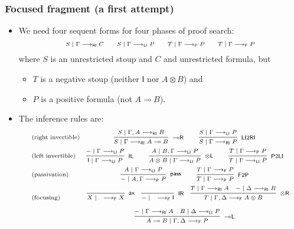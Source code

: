 \documentclass[10pt,t]{beamer}
\newcommand{\I}{\mathsf{I}}
\newcommand{\ot}{\otimes}
\newcommand{\ax}{\mathsf{ax}}
\newcommand{\uf}{\mathsf{pass}}
\newcommand{\IL}{\I\mathsf{L}}
\newcommand{\otL}{\ot\mathsf{L}}
\newcommand{\IR}{\I\mathsf{R}}
\newcommand{\otR}{\ot\mathsf{R}}
\newcommand{\loL}{{\lo}\mathsf{L}}
\newcommand{\loR}{{\lo}\mathsf{R}}
\renewcommand{\vdash}{\longrightarrow}
\newcommand{\lo}{\multimap}
\newcommand{\lolli}{\lo}
\newcommand{\proofbox}[1]{\begin{tabular}{l} #1 \end{tabular}}
\newcommand{\LI}{\mathsf{LI}}
\newcommand{\F}{\mathsf{F}}
\newcommand{\Pass}{\mathsf{P}}
\newcommand{\RI}{\mathsf{RI}}
\begin{document}
\begin{frame}


\frametitle{Focused fragment (a first attempt)}

\begin{itemize}

\item We need four sequent forms for four phases of proof search:
\[
\scriptsize
\begin{array}{c}
S \mid \Gamma \vdash_\RI C
\qquad S \mid \Gamma \vdash_\LI P
\qquad T \mid \Gamma \vdash_\Pass P
\qquad T \mid \Gamma \vdash_\F P
\end{array}
\]
where $S$ is an unrestricted stoup and $C$ and unrestricted formula,
but 
\begin{itemize}
\item $T$ is a negative stoup (neither $\I$ nor $A \ot B$) and
\item $P$ is a positive formula (not $A \lo B$).
\end{itemize}

\item The inference rules are:
\[
\scriptsize
  \begin{array}{l@{}c}
    \text{(right invertible)} & %
    \proofbox{
    \infer[\loR]{S \mid \Gamma \vdash_{\RI} A \lolli B}{S \mid \Gamma , A \vdash_{\RI} B}
    \qquad
    \infer[\LI 2 \RI]{S \mid \Gamma \vdash_{\RI} P}{S \mid \Gamma \vdash_{\LI} P}
    }
    \\[9pt]
    \text{(left invertible)} & %
    \proofbox{
    \infer[\IL]{\I \mid \Gamma \vdash_{\LI} P}{{-} \mid \Gamma \vdash_{\LI} P}
    \qquad
    \infer[\otL]{A \ot B \mid \Gamma \vdash_{\LI} P}{A \mid B , \Gamma \vdash_{\LI} P}
    \qquad
    \infer[\Pass 2 \LI]{T \mid \Gamma \vdash_{\LI} P}{T \mid \Gamma \vdash_{\Pass} P}
    }
    \\[9pt]
    \text{(passivation)} & %
    \proofbox{
      \infer[\uf]{{-} \mid A , \Gamma \vdash_{\Pass} P }{
      A\mid \Gamma \vdash_{\LI} P
    }
    \qquad
    \infer[\F 2 \Pass]{T \mid \Gamma \vdash_{\Pass} P}{
      T \mid \Gamma \vdash_{\F} P
    }
    }
    \\[9pt]
    \text{(focusing)} &    %
    \hspace*{3mm}
    \infer[\ax]{X \mid \quad \vdash_{\F} X}{}
    \quad
    \infer[\IR]{{-} \mid \quad \vdash_{\F} \I}{} 
    \quad 
    \infer[\otR]{T \mid \Gamma , \Delta \vdash_{\F} A \ot B}{
      T \mid \Gamma \vdash_{\RI} A
      &
      {-} \mid \Delta \vdash_{\RI} B
    }
\\[9pt]
&
    \infer[\loL]{A \lolli B \mid \Gamma , \Delta \vdash_{\F} P}{
      {-} \mid \Gamma \vdash_{\RI} A
      &
      B \mid \Delta \vdash_{\LI} P
    }
   \end{array}
\]

\end{itemize}

\end{frame}
\end{document}
